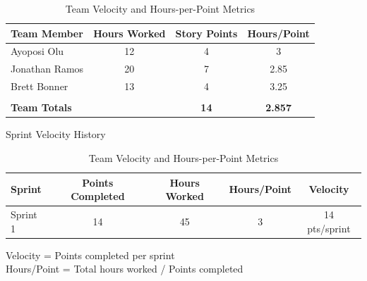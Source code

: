 \documentclass[12pt]{article} %
\begin{document}
\begin{table}[h]
\centering
\caption{Team Velocity and Hours-per-Point Metrics}
\begin{tabular}{|l|c|c|c|}
\hline
\textbf{Team Member} & \textbf{Hours Worked} & \textbf{Story Points} & \textbf{Hours/Point} \\
\hline
Ayoposi Olu & 12 & 4 & 3 \\
\hline
Jonathan Ramos & 20 & 7 & 2.85 \\
\hline
Brett Bonner & 13 & 4 & 3.25 \\
\hline
\multicolumn{4}{|c|}{} \\
\hline
\multicolumn{2}{|l|}{\textbf{Team Totals}} & \textbf{14} & \textbf{2.857} \\
\hline
\end{tabular}

\begin{center}
\small{Sprint Velocity History}
\end{center}
\begin{tabular}{|l|c|c|c|c|}
\hline
\textbf{Sprint} & \textbf{Points Completed} & \textbf{Hours Worked} & \textbf{Hours/Point} & \textbf{Velocity} \\
\hline
Sprint 1 & 14 & 45 & 3 & 14 pts/sprint \\
\hline
\end{tabular}

\vspace{0.5cm}
\begin{center}
\small{Velocity = Points completed per sprint \\
Hours/Point = Total hours worked / Points completed}
\end{center}
\end{table}
\end{document}
